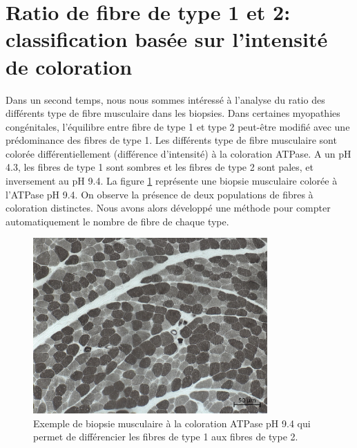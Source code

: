 \section{Ratio de fibre de type 1 et 2: classification basée sur l'intensité de coloration}

Dans un second temps, nous nous sommes intéressé à l'analyse du ratio des différents type de fibre musculaire dans les biopsies. Dans certaines myopathies congénitales, l'équilibre entre fibre de type 1 et type 2 peut-être modifié avec une prédominance des fibres de type 1. Les différents type de fibre musculaire sont colorée différentiellement (différence d'intensité) à la coloration ATPase. A un pH 4.3, les fibres de type 1 sont sombres et les fibres de type 2 sont pales, et inversement au pH 9.4. La figure \ref{fig:atp_example} représente une biopsie musculaire colorée à l'ATPase pH 9.4. On observe la présence de deux populations de fibres à coloration distinctes. Nous avons alors développé une méthode pour compter automatiquement le nombre de fibre de chaque type.
\begin{figure}[htbp]
 \centering
 \includegraphics[width=0.8\textwidth]{figures/atp_example.png}
 \caption[Exemple de biopsie musculaire à la coloration ATPase pH 9.4]{Exemple de biopsie musculaire à la coloration ATPase pH 9.4 qui permet de différencier les fibres de type 1 aux fibres de type 2.}
 \label{fig:atp_example}
\end{figure}
